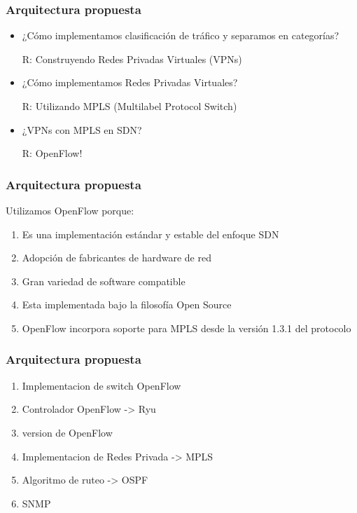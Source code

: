 \documentclass{beamer}
\begin{document}
\begin{frame}
\frametitle{Arquitectura propuesta} 

\begin{itemize}
\item ¿C\'omo implementamos clasificación de tr\'afico y separamos en categorías?

\pause
R: Construyendo Redes Privadas Virtuales (VPNs)
\pause

\vspace{0.5cm}
\item ¿C\'omo implementamos Redes Privadas Virtuales?

\pause
R: Utilizando MPLS (Multilabel Protocol Switch)

\pause
\vspace{0.5cm}
\item ¿VPNs con MPLS en SDN?

\pause
R: OpenFlow!

\end{itemize}

\end{frame}


\begin{frame}
\frametitle{Arquitectura propuesta} 

Utilizamos OpenFlow porque:

\begin{enumerate}[<+->]
\item Es una implementaci\'on estándar y estable del enfoque SDN
\item Adopci\'on de fabricantes de hardware de red
\item Gran variedad de software compatible
\item Esta implementada bajo la filosofía Open Source
\item OpenFlow incorpora soporte para MPLS desde la versi\'on 1.3.1 del protocolo
\end{enumerate}

\end{frame}

\begin{frame}
\frametitle{Arquitectura propuesta} 

\begin{enumerate}
\item Implementacion de switch OpenFlow
\item Controlador OpenFlow -> Ryu
\item version de OpenFlow
\item Implementacion de Redes Privada -> MPLS
\item Algoritmo de ruteo -> OSPF
\item SNMP
\end{enumerate}

\end{frame}
\end{document}
